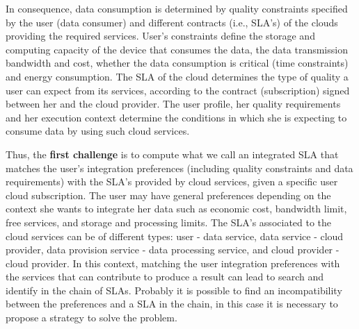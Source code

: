 \documentclass[11pt,a4paper,oneside]{report}
\begin{document}
In consequence, data consumption is determined by quality constraints specified by the user (data consumer) and different contracts (i.e., SLA's) of the clouds providing the required services. User's constraints define the storage and computing capacity of the device that consumes the data, the data transmission bandwidth and cost, whether the data consumption is critical (time constraints) and energy consumption. The SLA of the cloud determines the type of quality a user can expect from its services, according to the contract (subscription) signed between her and the cloud provider. The user profile, her quality requirements and her execution context determine the conditions in which she is expecting to consume data by using such cloud services.

Thus, the \textbf{first challenge} is to compute what we call an integrated SLA that matches the user's integration preferences (including quality constraints and data requirements) with the SLA's provided by cloud services, given a specific user cloud subscription. The user may have general preferences depending on the context she wants to integrate her data such as economic cost, bandwidth limit, free services, and storage and processing limits. The SLA's associated to the cloud services can be of different types: user - data service, data service - cloud provider, data provision service - data processing service, and cloud provider - cloud provider. In this context, matching the user integration preferences with the services that can contribute to produce a result can lead to search and identify in the chain of SLAs. Probably it is possible to find an incompatibility between the preferences and a SLA in the chain, in this case it is necessary to propose a strategy to solve the problem. 

\end{document}
